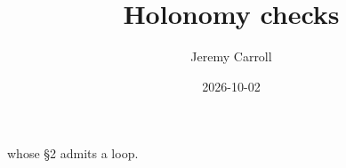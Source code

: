\documentclass[
  11pt,
]{article}
\title{Holonomy checks}
\author{Jeremy Carroll}
\date{2026-10-02}
\begin{document}
\makeatletter
\begin{center}
{\LARGE \@title\par}
\vspace{0.8em}
{\normalsize \@author\par}
\vspace{0.5em}
{\small \@date\par}
\end{center}
\makeatother
whose §2 admits a loop.
\end{document}
